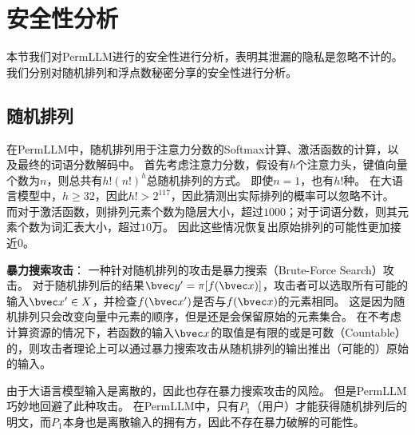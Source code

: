 \section{安全性分析}
本节我们对PermLLM进行的安全性进行分析，表明其泄漏的隐私是忽略不计的。
%
我们分别对随机排列和浮点数秘密分享的安全性进行分析。


\subsection{随机排列}
在PermLLM中，随机排列用于注意力分数的Softmax计算、激活函数的计算，以及最终的词语分数解码中。
%
首先考虑注意力分数，假设有$h$个注意力头，键值向量个数为$n$，则总共有$h!(n!)^h$总随机排列的方式。
即使$n=1$，也有$h!$种。
在大语言模型中，$h \ge 32$，因此$h! > 2^{117}$，因此猜测出实际排列的概率可以忽略不计。
%
而对于激活函数，则排列元素个数为隐层大小，超过$1000$；对于词语分数，则其元素个数为词汇表大小，超过$10$万。
因此这些情况恢复出原始排列的可能性更加接近0。
%

\textbf{暴力搜索攻击}：
一种针对随机排列的攻击是暴力搜索（Brute-Force Search）攻击。
对于随机排列后的结果$\bvec y' = \pi[f(\bvec x)]$，攻击者可以选取所有可能的输入$\bvec x' \in X$，并检查$f(\bvec x')$是否与$f(\bvec x)$的元素相同。
这是因为随机排列只会改变向量中元素的顺序，但是还是会保留原始的元素集合。
在不考虑计算资源的情况下，若函数的输入$\bvec x$的取值是有限的或是可数（Countable）的，则攻击者理论上可以通过暴力搜索攻击从随机排列的输出推出（可能的）原始的输入。

%
由于大语言模型输入是离散的，因此也存在暴力搜索攻击的风险。
但是PermLLM巧妙地回避了此种攻击。
%
在PermLLM中，只有$P_1$（用户）才能获得随机排列后的明文，而$P_1$本身也是离散输入的拥有方，因此不存在暴力破解的可能性。

